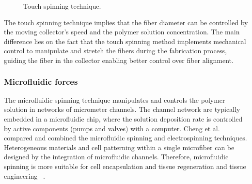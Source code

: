 \bgroup
\begin{figure}[!htbp]
\centering \makeatletter{}
\makeatother 
\caption{{Touch-spinning technique.}}
\label{f-f17259e76303}
\end{figure}

\egroup
The touch spinning technique implies that the fiber diameter can be controlled by the moving collector's speed and the polymer solution concentration. The main difference lies on the fact that the touch spinning method implements mechanical control to manipulate and stretch the fibers during the fabrication process, guiding the fiber in the collector enabling better control over fiber alignment.\unskip~\cite{527120:14091959}



\subsubsection{Microfluidic forces}The microfluidic spinning technique manipulates and controls the polymer solution in networks of micrometer channels. The channel network are typically embedded in a microfluidic chip, where the solution deposition rate is controlled by active components (pumps and valves) with a computer. Cheng et al. \unskip~\cite{527120:13656236} compared and combined the microfluidic spinning and electrospinning techniques. Heterogeneous materials and cell patterning within a single microfiber can be designed by the integration of microfluidic channels. Therefore, microfluidic spinning is more suitable for cell encapsulation and tissue regeneration and tissue engineering \unskip~\cite{527120:13656236}.

